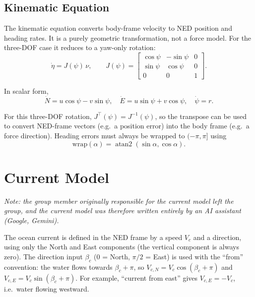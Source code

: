 \documentclass[10pt,conference]{IEEEtran}
\begin{document}
\subsection{Kinematic Equation}

The kinematic equation converts body-frame velocity to NED position
and heading rates. It is a purely geometric transformation, not a
force model. For the three-DOF case it reduces to a yaw-only rotation:
\begin{equation}
\dot\eta = J(\psi)\,\nu, \qquad
J(\psi) = \begin{bmatrix}
\cos\psi & -\sin\psi & 0 \\
\sin\psi & \cos\psi & 0 \\
0 & 0 & 1
\end{bmatrix}.
\label{eq:kinematics}
\end{equation}

In scalar form,
\begin{equation}
\dot N = u\cos\psi - v\sin\psi, \quad
\dot E = u\sin\psi + v\cos\psi, \quad
\dot\psi = r.
\end{equation}

For this three-DOF rotation, $J^\top(\psi) = J^{-1}(\psi)$, so the
transpose can be used to convert NED-frame vectors (e.g.\ a position
error) into the body frame (e.g.\ a force direction). Heading errors
must always be wrapped to $(-\pi, \pi]$ using
\begin{equation}
\mathrm{wrap}(\alpha) = \operatorname{atan2}(\sin\alpha, \cos\alpha).
\label{eq:wrap}
\end{equation}

\section{Current Model}
\label{sec:current}

\emph{Note: the group member originally responsible for the current
model left the group, and the current model was therefore written
entirely by an AI assistant (Google, Gemini).}

The ocean current is defined in the NED frame by a speed
$V_c$ and a direction, using only the North and East components (the
vertical component is always zero). The direction input $\beta_c$
(0 = North, $\pi/2$ = East) is used with the ``from'' convention: the
water flows towards $\beta_c+\pi$, so
$V_{c,N}=V_c\cos(\beta_c+\pi)$ and $V_{c,E}=V_c\sin(\beta_c+\pi)$.
For example, ``current from east'' gives $V_{c,E}=-V_c$, i.e.\ water
flowing westward.
\end{document}
